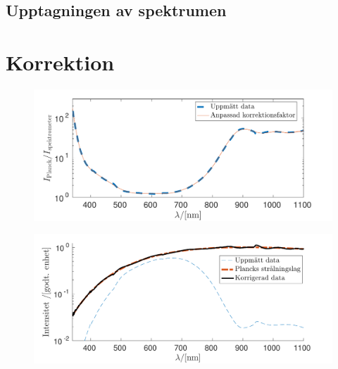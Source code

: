 \documentclass[11pt,a4paper]{article}
\begin{document}
\subsection{Upptagningen av spektrumen}









\newpage
{}




\clearpage
\appendix
\setcounter{page}{1}
\renewcommand*{\thepage}{A\arabic{page}}

\section{Korrektion}

\begin{figure}\centering
\centerline{ %
\includegraphics[width=.9\textwidth]{korrektionsfaktor.pdf}
}
\caption{\label{fig:korrektionsfaktor} }
\end{figure}

\begin{figure}\centering
\centerline{ %
\includegraphics[width=.9\textwidth]{anpassad_svartkropp.pdf}
}
\caption{\label{fig:anpassad_svartkropp} }
\end{figure}
\end{document}
